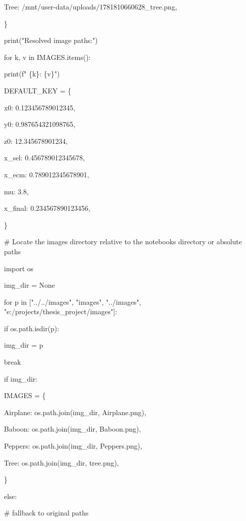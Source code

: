 \textquotesingle Tree\textquotesingle: \textquotesingle/mnt/user-data/uploads/1781810660628\_tree.png\textquotesingle,

\}

print("Resolved image paths:")

for k, v in IMAGES.items():

print(f" \{k\}: \{v\}")

DEFAULT\_KEY = \{

\textquotesingle x0\textquotesingle: 0.123456789012345,

\textquotesingle y0\textquotesingle: 0.987654321098765,

\textquotesingle z0\textquotesingle: 12.345678901234,

\textquotesingle x\_sel\textquotesingle: 0.456789012345678,

\textquotesingle x\_ecm\textquotesingle: 0.789012345678901,

\textquotesingle mu\textquotesingle: 3.8,

\textquotesingle x\_final\textquotesingle: 0.234567890123456,

\}

\# Locate the images directory relative to the notebook\textquotesingle s directory or absolute paths

import os

img\_dir = None

for p in {[}"../../images", "images", "../images", "e:/projects/thesis\_project/images"{]}:

if os.path.isdir(p):

img\_dir = p

break

if img\_dir:

IMAGES = \{

\textquotesingle Airplane\textquotesingle: os.path.join(img\_dir, \textquotesingle Airplane.png\textquotesingle),

\textquotesingle Baboon\textquotesingle: os.path.join(img\_dir, \textquotesingle Baboon.png\textquotesingle),

\textquotesingle Peppers\textquotesingle: os.path.join(img\_dir, \textquotesingle Peppers.png\textquotesingle),

\textquotesingle Tree\textquotesingle: os.path.join(img\_dir, \textquotesingle tree.png\textquotesingle),

\}

else:

\# fallback to original paths

